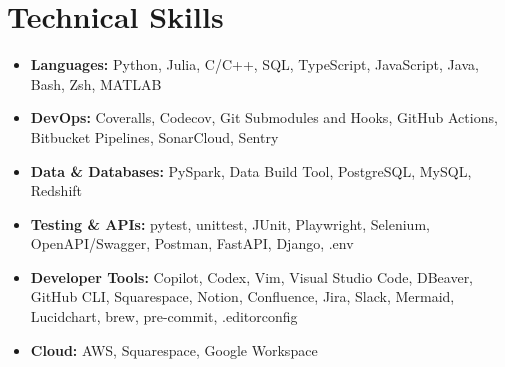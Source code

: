 \documentclass[10pt,letterpaper]{article}
\newcommand{\resumeItem}[1]{\item \small #1}
\begin{document}
\section*{Technical Skills}
\small
  \begin{itemize}
    \resumeItem{\textbf{Languages:} Python, Julia, C/C++, SQL, TypeScript, JavaScript, Java, Bash, Zsh, MATLAB}
    \resumeItem{\textbf{DevOps:} Coveralls, Codecov, Git Submodules and Hooks, GitHub Actions, Bitbucket Pipelines, SonarCloud, Sentry}
    \resumeItem{\textbf{Data \& Databases:} PySpark, Data Build Tool, PostgreSQL, MySQL, Redshift}
    \resumeItem{\textbf{Testing \& APIs:} pytest, unittest, JUnit, Playwright, Selenium, OpenAPI/Swagger, Postman, FastAPI, Django, .env}
    \resumeItem{\textbf{Developer Tools:} Copilot, Codex, Vim, Visual Studio Code, DBeaver, GitHub CLI, Squarespace, Notion, Confluence, Jira, Slack, Mermaid, Lucidchart, brew, pre-commit, .editorconfig}
    \resumeItem{\textbf{Cloud:} AWS, Squarespace, Google Workspace}
  \end{itemize}
  
\end{document}
